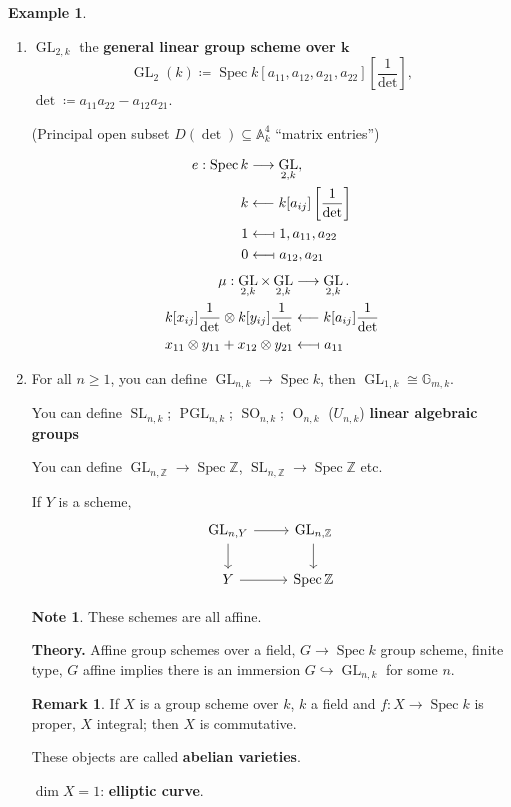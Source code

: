 \documentclass[12pt]{article}
\DeclareMathOperator{\Spec}{Spec}
\DeclareMathOperator{\GL}{GL}
\DeclareMathOperator{\SL}{SL}
\DeclareMathOperator{\PGL}{PGL}
\DeclareMathOperator{\SO}{SO}
\DeclareMathOperator{\OG}{O}
\theoremstyle{definition}
\newtheorem*{remark}{Remark}
\newtheorem*{note}{Note}
\newtheorem*{example}{Example}
\theoremstyle{remark}
\begin{document}
\begin{example}
\begin{enumerate}[label=\arabic*)]
\item $\GL_{2,k}$ the \textbf{general linear group scheme over $\boldsymbol{k}$}
\[\GL_2(k)\coloneqq\Spec k[a_{11},a_{12},a_{21},a_{22}]\left[\frac{1}{\det}\right],\]
$\det\coloneqq a_{11}a_{22}-a_{12}a_{21}$.

(Principal open subset $D(\det)\subseteq\mathbb{A}_k^4$ ``matrix entries'')

\begin{align*}
e:\Spec k&\longrightarrow \GL_{2,k},\\
k&\longleftarrow k[a_{ij}]\left[\frac{1}{\det}\right]\\
1&\longleftarrow\!\shortmid1,a_{11},a_{22}\\
0&\longleftarrow\!\shortmid a_{12},a_{21}
\end{align*}
\begin{align*}
\mu:\GL_{2,k}\times\GL_{2,k}&\longrightarrow\GL_{2,k}.\\
k[x_{ij}]\frac{1}{\det}\otimes k[y_{ij}]\frac{1}{\det}&\longleftarrow k[a_{ij}]\frac{1}{\det}\\
x_{11}\otimes y_{11}+x_{12}\otimes y_{21}&\longleftarrow\!\shortmid a_{11}
\end{align*}

\item For all $n\geq1$, you can define $\GL_{n,k}\rightarrow\Spec k$, then $\GL_{1,k}\cong\mathbb{G}_{m,k}$.

You can define $\SL_{n,k}$; $\PGL_{n,k}$; $\SO_{n,k}$; $\OG_{n,k}$ ($U_{n,k}$) \textbf{linear algebraic groups}

You can define $\GL_{n,\mathbb{Z}}\rightarrow\Spec\mathbb{Z}$, $\SL_{n,\mathbb{Z}}\rightarrow\Spec\mathbb{Z}$ etc.

If $Y$ is a scheme,
\[
\begin{tikzcd}
\GL_{n,Y}\arrow[r]\arrow[d]&\GL_{n,\mathbb{Z}}\arrow[d]\\
Y\arrow[r]&\Spec\mathbb{Z}
\end{tikzcd}
\]

\begin{note}
These schemes are all affine.
\end{note}

\textbf{Theory.} Affine group schemes over a field, $G\rightarrow\Spec k$ group scheme, finite type, $G$ affine implies there is an immersion $G\hookrightarrow\GL_{n,k}$ for some $n$.

\begin{remark}
If $X$ is a group scheme over $k$, $k$ a field and $f:X\rightarrow\Spec k$ is proper, $X$ integral; then $X$ is commutative.

These objects are called \textbf{abelian varieties}.

$\dim X=1$: \textbf{elliptic curve}.
\end{remark}
\end{enumerate}
\end{example}
\end{document}
